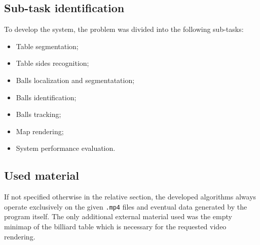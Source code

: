 \subsection{Sub-task identification}
To develop the system, the problem was divided into the following sub-tasks:
\begin{itemize}
    \item Table segmentation;
    \item Table sides recognition;
    \item Balls localization and segmentatation;
    \item Balls identification;
    \item Balls tracking;
    \item Map rendering;
    \item System performance evaluation.
\end{itemize}



\subsection{Used material}
If not specified otherwise in the relative section, the developed algorithms always operate exclusively on the given \verb|.mp4| files and
eventual data generated by the program itself. The only additional external material used was the empty minimap of the billiard table which is necessary for
the requested video rendering.